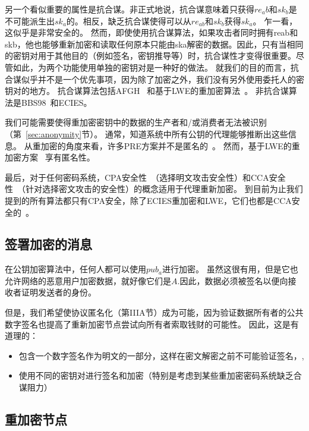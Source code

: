 \documentclass[longbibliography,nofootinbib]{revtex4-1}
\begin{document}
\begin{CJK*}{UTF8}{gbsn}
另一个看似重要的属性是抗合谋。非正式地说，抗合谋意味着只获得$re_ab$和$sk_b$是不可能派生出$sk_a$的。相反，缺乏抗合谋使得可以从$re_{ab}$和$sk_b$获得$sk_a$。 乍一看，这似乎是非常安全的。 然而，即使使用抗合谋算法，如果攻击者同时拥有reab和skb，他也能够重新加密和读取任何原本只能由ska解密的数据。因此，只有当相同的密钥对用于其他目的（例如签名，密钥推导等）时，抗合谋性才变得很重要。尽管如此，为两个功能使用单独的密钥对是一种好的做法。 就我们的目的而言，抗合谋似乎并不是一个优先事项，因为除了加密之外，我们没有另外使用委托人的密钥对的地方。 抗合谋算法包括AFGH~\cite{AFGH} 和基于LWE的重加密算法~\cite{lwe-reencryption}。 非抗合谋算法是BBS98~\cite{BBS98}和ECIES。


我们可能需要使得重加密密钥中的数据的生产者和/或消费者无法被识别（第~\ref{sec:anonymity}节）。 通常，知道系统中所有公钥的代理能够推断出这些信息。 从重加密的角度来看，许多PRE方案并不是匿名的~\cite{BBS98,AFGH}。 然而，基于LWE的重加密方案 ~\cite{lwe-reencryption}享有匿名性。

最后，对于任何密码系统，CPA安全性~\cite{wiki:cpa}（选择明文攻击安全性）和CCA安全性~\cite{wiki:cca}（针对选择密文攻击的安全性）的概念适用于代理重新加密。 到目前为止我们提到的所有算法都只有CPA安全，除了ECIES重加密和LWE，它们也都是CCA安全的~\cite{lwe-reencryption}。


\subsection{签署加密的消息}

    在公钥加密算法中，任何人都可以使用$pub_a$进行加密。 虽然这很有用，但是它也允许网络的恶意用户加密数据，就好像它们是$A$.因此，数据必须被签名以便向接收者证明发送者的身份。
    
    但是，我们希望使协议匿名化（第IIIA节）成为可能，因为验证数据所有者的公共数字签名也提高了重新加密节点尝试向所有者索取钱财的可能性。 因此，这是有道理的：

\begin{itemize}
    \item 包含一个数字签名作为明文的一部分，这样在密文解密之前不可能验证签名，,
    \item 使用不同的密钥对进行签名和加密（特别是考虑到某些重加密密码系统缺乏合谋阻力）
\end{itemize}

\subsection{重加密节点}


\end{CJK*}
\end{document}

